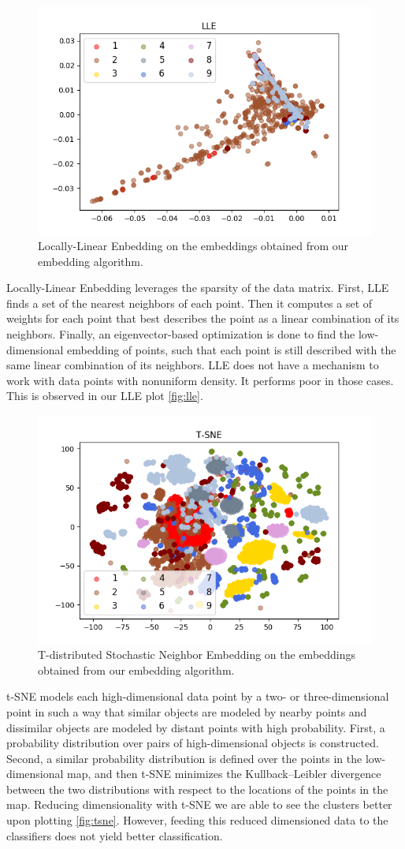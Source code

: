 \documentclass[oneside, twocolumn, a4paper, 10pt]{IEEEtran}
\begin{document}
\par
\begin{figure}
\centering
\includegraphics[width=0.6\linewidth]{../data/visualization/LLE.png}
\caption{Locally-Linear Enbedding on the embeddings obtained from our embedding algorithm.}
\label{fig:lle}
\end{figure}
Locally-Linear Enbedding leverages the sparsity of the data matrix. First, LLE finds a set of the nearest neighbors of each point. Then it computes a set of weights for each point that best describes the point as a linear combination of its neighbors. Finally, an eigenvector-based optimization is done to find the low-dimensional embedding of points, such that each point is still described with the same linear combination of its neighbors. LLE does not have a mechanism to work with data points with nonuniform density. It performs poor in those cases. This is observed in our LLE plot \autoref{fig:lle}.\\
\par
\begin{figure}
\centering
\includegraphics[width=0.6\linewidth]{../data/visualization/T-SNE.png}
\caption{T-distributed Stochastic Neighbor Embedding on the embeddings obtained from our embedding algorithm.}
\label{fig:tsne}
\end{figure}
t-SNE models each high-dimensional data point by a two- or three-dimensional point in such a way that similar objects are modeled by nearby points and dissimilar objects are modeled by distant points with high probability. First, a probability distribution over pairs of high-dimensional objects is constructed. Second, a similar probability distribution is defined over the points in the low-dimensional map, and then t-SNE minimizes the Kullback–Leibler divergence between the two distributions with respect to the locations of the points in the map. Reducing dimensionality with t-SNE we are able to see the clusters better upon plotting \autoref{fig:tsne}. However, feeding this reduced dimensioned data to the classifiers does not yield better classification.\\
\end{document}
